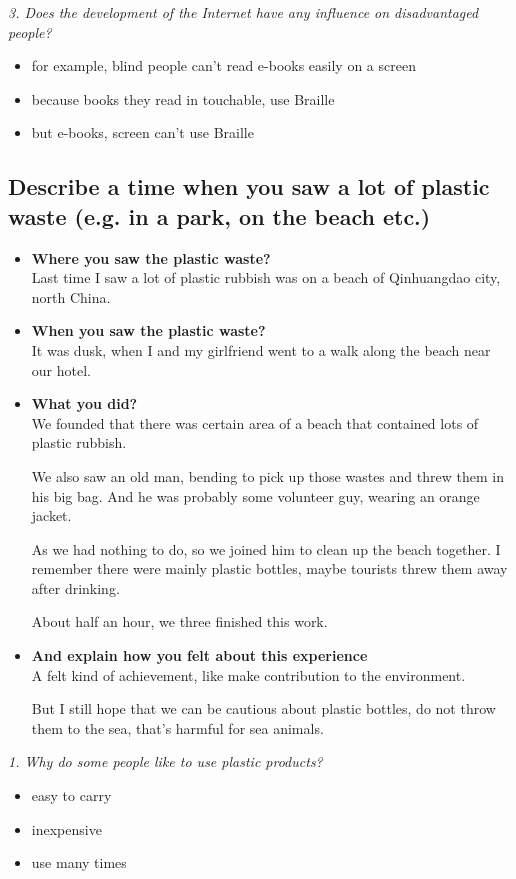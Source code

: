 \documentclass[conference]{IEEEtran}
\begin{document}
\textit{3. Does the development of the Internet have any influence on disadvantaged people?}
\begin{itemize}
    \item for example, blind people can't read e-books easily on a screen
    \item because books they read in touchable, use Braille
    \item but e-books, screen can't use Braille
\end{itemize}

\subsection{Describe a time when you saw a lot of plastic waste (e.g. in a park, on the beach
etc.)}
\begin{itemize}
    \item \textbf{Where you saw the plastic waste?}\\
    Last time I saw a lot of plastic rubbish was on a beach of Qinhuangdao city, north China.
    \item \textbf{When you saw the plastic waste?}\\
    It was dusk, when I and my girlfriend  went to a walk along the beach near our hotel.
    \item \textbf{What you did?}\\
    We founded that there was certain area of a beach that contained lots of plastic rubbish.

    We also saw an old man, bending to pick up those wastes and threw them in his big bag.
    And he was probably some volunteer guy, wearing an orange jacket.

    As we had nothing to do, so we joined him to clean up the beach together.
    I remember there were mainly plastic bottles, maybe tourists threw them away after drinking.

    About half an hour, we three finished this work.
    \item \textbf{And explain how you felt about this experience}\\
    A felt kind of achievement, like make contribution to the environment.

    But I still hope that we can be cautious about plastic bottles, do not throw them to the sea, that's
    harmful for sea animals.
\end{itemize}

\textit{1. Why do some people like to use plastic products?}
\begin{itemize}
    \item easy to carry
    \item inexpensive
    \item use many times
\end{itemize}
\end{document}
